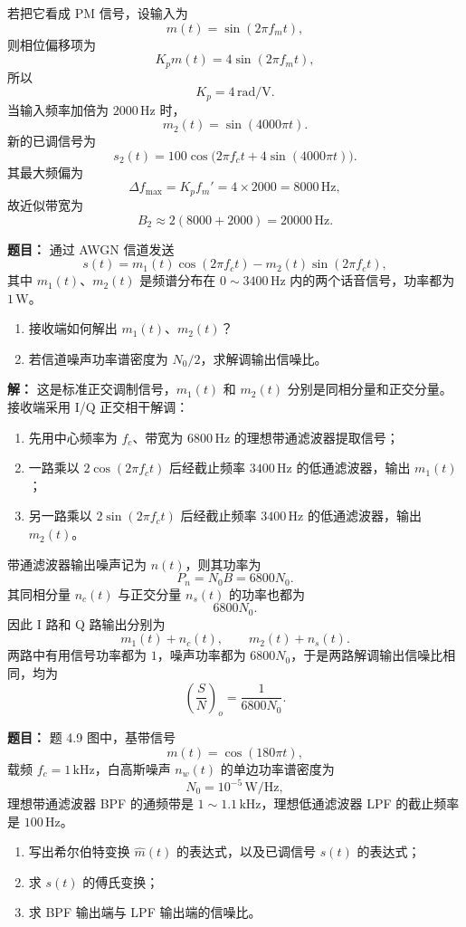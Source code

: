 若把它看成 PM 信号，设输入为
\[
m(t)=\sin(2\pi f_mt),
\]
则相位偏移项为
\[
K_pm(t)=4\sin(2\pi f_mt),
\]
所以
\[
K_p=4\,\mathrm{rad/V}.
\]
当输入频率加倍为 $2000\,\mathrm{Hz}$ 时，
\[
m_2(t)=\sin(4000\pi t).
\]
新的已调信号为
\[
s_2(t)=100\cos\bigl(2\pi f_ct+4\sin(4000\pi t)\bigr).
\]
其最大频偏为
\[
\Delta f_{\max}=K_pf_m'=4\times 2000=8000\,\mathrm{Hz},
\]
故近似带宽为
\[
B_2\approx 2(8000+2000)=20000\,\mathrm{Hz}.
\]

\medskip
{}
\textbf{题目：}
通过 AWGN 信道发送
\[
s(t)=m_1(t)\cos(2\pi f_ct)-m_2(t)\sin(2\pi f_ct),
\]
其中 $m_1(t)$、$m_2(t)$ 是频谱分布在 $0\sim 3400\,\mathrm{Hz}$ 内的两个话音信号，功率都为 $1\,\mathrm{W}$。

\begin{enumerate}
\item 接收端如何解出 $m_1(t)$、$m_2(t)$？
\item 若信道噪声功率谱密度为 $N_0/2$，求解调输出信噪比。
\end{enumerate}

\par\textbf{解：}
这是标准正交调制信号，$m_1(t)$ 和 $m_2(t)$ 分别是同相分量和正交分量。接收端采用 I/Q 正交相干解调：
\begin{enumerate}
\item 先用中心频率为 $f_c$、带宽为 $6800\,\mathrm{Hz}$ 的理想带通滤波器提取信号；
\item 一路乘以 $2\cos(2\pi f_ct)$ 后经截止频率 $3400\,\mathrm{Hz}$ 的低通滤波器，输出 $m_1(t)$；
\item 另一路乘以 $2\sin(2\pi f_ct)$ 后经截止频率 $3400\,\mathrm{Hz}$ 的低通滤波器，输出 $m_2(t)$。
\end{enumerate}

带通滤波器输出噪声记为 $n(t)$，则其功率为
\[
P_n=N_0B=6800N_0.
\]
其同相分量 $n_c(t)$ 与正交分量 $n_s(t)$ 的功率也都为
\[
6800N_0.
\]
因此 I 路和 Q 路输出分别为
\[
m_1(t)+n_c(t),\qquad m_2(t)+n_s(t).
\]
两路中有用信号功率都为 $1$，噪声功率都为 $6800N_0$，于是两路解调输出信噪比相同，均为
\[
\left(\frac{S}{N}\right)_o=\frac{1}{6800N_0}.
\]

\medskip
{}
\textbf{题目：}
题 4.9 图中，基带信号
\[
m(t)=\cos(180\pi t),
\]
载频 $f_c=1\,\mathrm{kHz}$，白高斯噪声 $n_w(t)$ 的单边功率谱密度为
\[
N_0=10^{-5}\,\mathrm{W/Hz},
\]
理想带通滤波器 BPF 的通频带是 $1\sim 1.1\,\mathrm{kHz}$，理想低通滤波器 LPF 的截止频率是 $100\,\mathrm{Hz}$。

\begin{enumerate}
\item 写出希尔伯特变换 $\hat m(t)$ 的表达式，以及已调信号 $s(t)$ 的表达式；
\item 求 $s(t)$ 的傅氏变换；
\item 求 BPF 输出端与 LPF 输出端的信噪比。
\end{enumerate}

